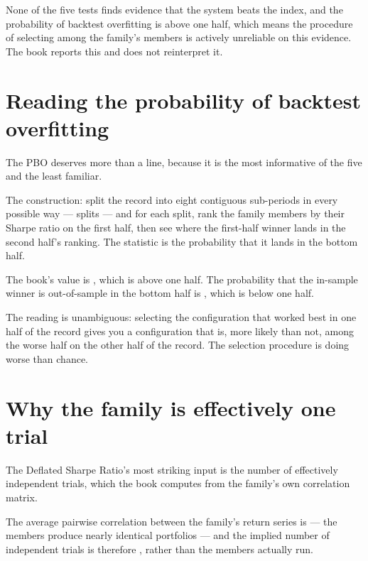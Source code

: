 \begin{takeaway}
None of the five tests finds evidence that the system beats the index, and
the probability of backtest overfitting is above one half, which means the
procedure of selecting among the family's members is actively unreliable
on this evidence. The book reports this and does not reinterpret it.
\end{takeaway}

\section{Reading the probability of backtest overfitting}

The PBO deserves more than a line, because it is the most informative of
the five and the least familiar.

The construction: split the record into eight contiguous sub-periods in
every possible way --- \numPBOSplits{} splits --- and for each split,
rank the \numPBOTrials{} family members by their Sharpe ratio on the first
half, then see where the first-half winner lands in the second half's
ranking. The statistic is the probability that it lands in the bottom
half.

The book's value is \numPBO{}, which is above one half. The probability
that the in-sample winner is out-of-sample in the bottom half is
\numPBOProb{}, which is below one half.

The reading is unambiguous: selecting the configuration that worked best
in one half of the record gives you a configuration that is, more likely
than not, among the worse half on the other half of the record. The
selection procedure is doing worse than chance.

\section{Why the family is effectively one trial}

The Deflated Sharpe Ratio's most striking input is the number of
effectively independent trials, which the book computes from the family's
own correlation matrix.

The average pairwise correlation between the family's return series is
\numAvgCorr{} --- the members produce nearly identical portfolios --- and
the implied number of independent trials is therefore
\numImpliedTrials{}, rather than the \numFamilySize{} members actually run.

